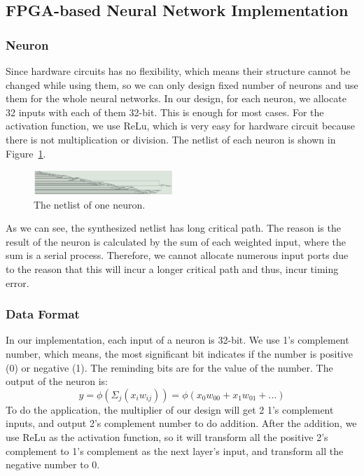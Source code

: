 \documentclass[conference]{IEEEtran}
\begin{document}
\subsection{FPGA-based Neural Network Implementation}

\subsubsection{Neuron}

Since hardware circuits has no flexibility, which means their structure cannot be changed while using them, so we can only design fixed number of neurons and use them for the whole neural networks. In our design, for each neuron, we allocate 32 inputs with each of them 32-bit. This is enough for most cases. For the activation function, we use ReLu, which is very easy for hardware circuit because there is not multiplication or division. The netlist of each neuron is shown in Figure~\ref{fig:nnnl}.

\begin{figure}[!hbt]
	\centering
	\includegraphics[width=0.47\textwidth]{neuron_nl.png}
	\caption{The netlist of one neuron.}
	\label{fig:nnnl}
\end{figure}

As we can see, the synthesized netlist has long critical path. The reason is the result of the neuron is calculated by the sum of each weighted input, where the sum is a serial process. Therefore, we cannot allocate numerous input ports due to the reason that this will incur a longer critical path and thus, incur timing error.

\subsubsection{Data Format}

In our implementation, each input of a neuron is 32-bit. We use 1's complement number, which means, the most significant bit indicates if the number is positive (0) or negative (1). The reminding bits are for the value of the number. The output of the neuron is:
\begin{equation}
y=\phi(\Sigma_{j}(x_i w_{ij}))
=\phi(x_0 w_{00}+x_1 w_{01}+...)
\end{equation}
To do the application, the multiplier of our design will get 2 1's complement inputs, and output 2's complement number to do addition. After the addition, we use ReLu as the activation function, so it will transform all the positive 2's complement to 1's complement as the next layer's input, and transform all the negative number to 0.
\end{document}
